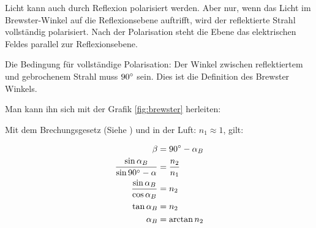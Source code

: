 Licht kann auch durch Reflexion polarisiert werden. Aber nur, wenn das Licht im Brewster-Winkel auf die Reflexionsebene auftrifft, wird der reflektierte Strahl vollständig polarisiert. Nach der Polarisation steht die Ebene das elektrischen Feldes parallel zur Reflexionsebene.

Die Bedingung für vollständige Polarisation: Der Winkel zwischen reflektiertem und gebrochenem Strahl muss $90\degree$ sein. Dies ist die Definition des Brewster Winkels.

Man kann ihn sich mit der Grafik \ref{fig:brewster} herleiten:

Mit dem Brechungsgesetz (Siehe ) und in der Luft: $n_1 \approx 1$, gilt:

\begin{align}
\begin{split}
	\beta &= 90\degree - \alpha_B \\
	\frac{\sin{\alpha_B}}{\sin{90\degree - \alpha}} &= \frac{n_2}{n_1} \\
	\frac{\sin{\alpha_B}}{\cos{\alpha_B}} &= n_2 \\
	\tan{\alpha_B} &= n_2 \\
	\alpha_B &= \arctan{n_2}
\end{split}
\end{align}